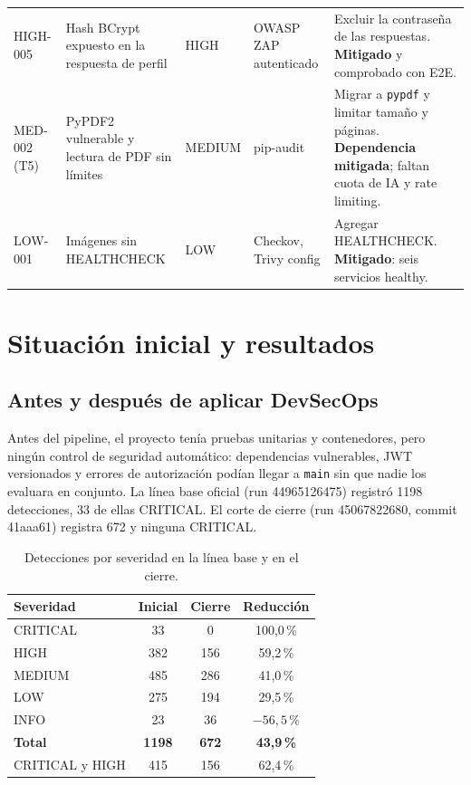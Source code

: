 \documentclass[12pt,a4paper]{article}
\begin{document}
{\begin{longtable}{L{1.9cm}L{3.2cm}L{1.9cm}L{2.4cm}L{4.8cm}}
  \addlinespace
  HIGH-005 & Hash BCrypt expuesto en la respuesta de perfil & HIGH & OWASP ZAP autenticado &
  Excluir la contraseña de las respuestas. \textbf{Mitigado} y comprobado con E2E. \\
  \addlinespace
  MED-002 (T5) & PyPDF2 vulnerable y lectura de PDF sin límites & MEDIUM & pip-audit & Migrar a
  \texttt{pypdf} y limitar tamaño y páginas. \textbf{Dependencia mitigada}; faltan cuota de IA y
  rate limiting. \\
  \addlinespace
  LOW-001 & Imágenes sin HEALTHCHECK & LOW & Checkov, Trivy config & Agregar HEALTHCHECK.
  \textbf{Mitigado}: seis servicios healthy. \\
\end{longtable}
}

\section{Situación inicial y resultados}
\label{sec:resultados}

\subsection{Antes y después de aplicar DevSecOps}

Antes del pipeline, el proyecto tenía pruebas unitarias y contenedores, pero ningún control de
seguridad automático: dependencias vulnerables, JWT versionados y errores de autorización podían
llegar a \texttt{main} sin que nadie los evaluara en conjunto. La línea base oficial (run
44965126475) registró 1198 detecciones, 33 de ellas CRITICAL. El corte de cierre (run 45067822680,
commit 41aaa61) registra 672 y ninguna CRITICAL.

\begin{table}[htbp]
  \centering
  \caption{Detecciones por severidad en la línea base y en el cierre.}
  \label{tab:antes-despues}
  \small
  \begin{tabular}{lccc}
    \toprule
    \textbf{Severidad} & \textbf{Inicial} & \textbf{Cierre} & \textbf{Reducción} \\
    \midrule
    CRITICAL & 33 & 0 & 100,0\,\% \\
    HIGH & 382 & 156 & 59,2\,\% \\
    MEDIUM & 485 & 286 & 41,0\,\% \\
    LOW & 275 & 194 & 29,5\,\% \\
    INFO & 23 & 36 & $-56{,}5$\,\% \\
    \midrule
    \textbf{Total} & \textbf{1198} & \textbf{672} & \textbf{43,9\,\%} \\
    CRITICAL y HIGH & 415 & 156 & 62,4\,\% \\
    \bottomrule
  \end{tabular}
\end{table}
\end{document}
